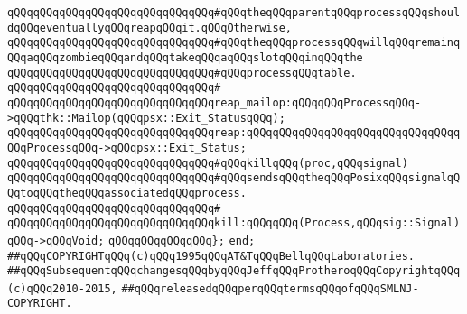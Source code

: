 \verb|qQQqqQQqqQQqqQQqqQQqqQQqqQQqqQQq#qQQqtheqQQqparentqQQqprocessqQQqshouldqQQqeventuallyqQQqreapqQQqit.qQQqOtherwise,|\newline
\verb|qQQqqQQqqQQqqQQqqQQqqQQqqQQqqQQq#qQQqtheqQQqprocessqQQqwillqQQqremainqQQqaqQQqzombieqQQqandqQQqtakeqQQqaqQQqslotqQQqinqQQqthe|\newline
\verb|qQQqqQQqqQQqqQQqqQQqqQQqqQQqqQQq#qQQqprocessqQQqtable.|\newline
\verb|qQQqqQQqqQQqqQQqqQQqqQQqqQQqqQQq#|\newline
\verb|qQQqqQQqqQQqqQQqqQQqqQQqqQQqqQQqreap_mailop:qQQqqQQqProcessqQQq->qQQqthk::Mailop(qQQqpsx::Exit_StatusqQQq);|\newline
\verb|qQQqqQQqqQQqqQQqqQQqqQQqqQQqqQQqreap:qQQqqQQqqQQqqQQqqQQqqQQqqQQqqQQqqQQqProcessqQQq->qQQqpsx::Exit_Status;|\newline
\newline
\verb|qQQqqQQqqQQqqQQqqQQqqQQqqQQqqQQq#qQQqkillqQQq(proc,qQQqsignal)|\newline
\verb|qQQqqQQqqQQqqQQqqQQqqQQqqQQqqQQq#qQQqsendsqQQqtheqQQqPosixqQQqsignalqQQqtoqQQqtheqQQqassociatedqQQqprocess.|\newline
\verb|qQQqqQQqqQQqqQQqqQQqqQQqqQQqqQQq#|\newline
\verb|qQQqqQQqqQQqqQQqqQQqqQQqqQQqqQQqkill:qQQqqQQq(Process,qQQqsig::Signal)qQQq->qQQqVoid;|\newline
\verb|qQQqqQQqqQQqqQQq};|\newline
\verb|end;|\newline
\newline
\newline
\verb|##qQQqCOPYRIGHTqQQq(c)qQQq1995qQQqAT&TqQQqBellqQQqLaboratories.|\newline
\verb|##qQQqSubsequentqQQqchangesqQQqbyqQQqJeffqQQqProtheroqQQqCopyrightqQQq(c)qQQq2010-2015,|\newline
\verb|##qQQqreleasedqQQqperqQQqtermsqQQqofqQQqSMLNJ-COPYRIGHT.|\newline

